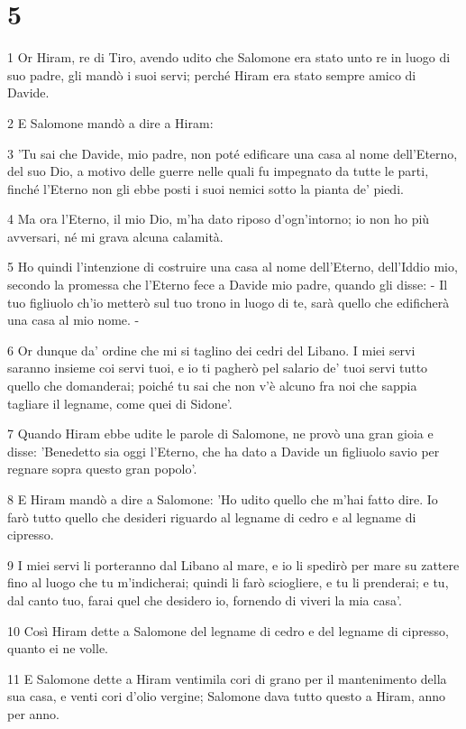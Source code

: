 \chapter{5}

\par 1 Or Hiram, re di Tiro, avendo udito che Salomone era stato unto re in luogo di suo padre, gli mandò i suoi servi; perché Hiram era stato sempre amico di Davide.
\par 2 E Salomone mandò a dire a Hiram:
\par 3 'Tu sai che Davide, mio padre, non poté edificare una casa al nome dell'Eterno, del suo Dio, a motivo delle guerre nelle quali fu impegnato da tutte le parti, finché l'Eterno non gli ebbe posti i suoi nemici sotto la pianta de' piedi.
\par 4 Ma ora l'Eterno, il mio Dio, m'ha dato riposo d'ogn'intorno; io non ho più avversari, né mi grava alcuna calamità.
\par 5 Ho quindi l'intenzione di costruire una casa al nome dell'Eterno, dell'Iddio mio, secondo la promessa che l'Eterno fece a Davide mio padre, quando gli disse: - Il tuo figliuolo ch'io metterò sul tuo trono in luogo di te, sarà quello che edificherà una casa al mio nome. -
\par 6 Or dunque da' ordine che mi si taglino dei cedri del Libano. I miei servi saranno insieme coi servi tuoi, e io ti pagherò pel salario de' tuoi servi tutto quello che domanderai; poiché tu sai che non v'è alcuno fra noi che sappia tagliare il legname, come quei di Sidone'.
\par 7 Quando Hiram ebbe udite le parole di Salomone, ne provò una gran gioia e disse: 'Benedetto sia oggi l'Eterno, che ha dato a Davide un figliuolo savio per regnare sopra questo gran popolo'.
\par 8 E Hiram mandò a dire a Salomone: 'Ho udito quello che m'hai fatto dire. Io farò tutto quello che desideri riguardo al legname di cedro e al legname di cipresso.
\par 9 I miei servi li porteranno dal Libano al mare, e io li spedirò per mare su zattere fino al luogo che tu m'indicherai; quindi li farò sciogliere, e tu li prenderai; e tu, dal canto tuo, farai quel che desidero io, fornendo di viveri la mia casa'.
\par 10 Così Hiram dette a Salomone del legname di cedro e del legname di cipresso, quanto ei ne volle.
\par 11 E Salomone dette a Hiram ventimila cori di grano per il mantenimento della sua casa, e venti cori d'olio vergine; Salomone dava tutto questo a Hiram, anno per anno.

